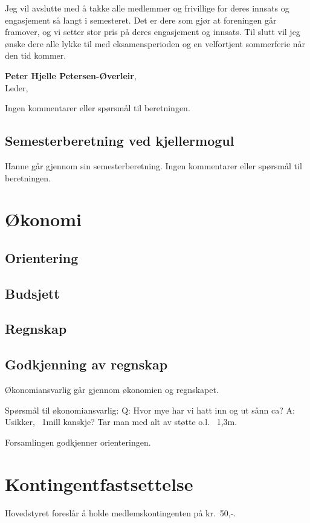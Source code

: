 \documentclass[10pt,norsk,a4paper,usenames,dvipsnames]{article}
\begin{document}
\begin{multicols}{2}
    Jeg vil avslutte med å takke alle medlemmer og frivillige for deres innsats og engasjement så langt i semesteret. Det er dere som gjør at foreningen går framover, og vi setter stor pris på deres engasjement og innsats. Til slutt vil jeg ønske dere alle lykke til med eksamensperioden og en velfortjent sommerferie når den tid kommer.

    \end{multicols}

    \textbf{Peter Hjelle Petersen-Øverleir}, \\
    Leder, \date{\emph{03. mai 2023}}

Ingen kommentarer eller spørsmål til beretningen.

    \subsection{Semesterberetning ved kjellermogul}
Hanne går gjennom sin semesterberetning. Ingen kommentarer eller spørsmål til beretningen.

\section{Økonomi}

    \subsection{Orientering}
    \subsection{Budsjett}
    \subsection{Regnskap}
    \subsection{Godkjenning av regnskap}

Økonomiansvarlig går gjennom økonomien og regnskapet.

Spørsmål til økonomiansvarlig:
Q: Hvor mye har vi hatt inn og ut sånn ca?
A: Usikker, ~1mill kanskje? Tar man med alt av støtte o.l. ~1,3m.

Forsamlingen godkjenner orienteringen.

\section{Kontingentfastsettelse}
    Hovedstyret foreslår å holde medlemskontingenten på kr.~50,-.
\end{document}
